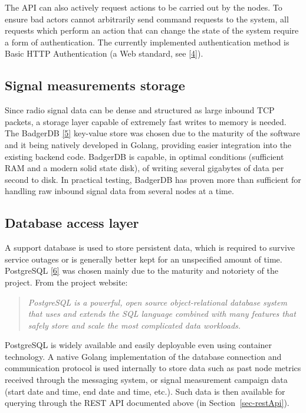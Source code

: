 \documentclass[
  letterpaper,
  a4paper,
  12pt,
  titlepage,
  oneside,
  openany]{book}
\begin{document}
The API can also actively request actions to be carried out by the
nodes. To ensure bad actors cannot arbitrarily send command requests to
the system, all requests which perform an action that can change the
state of the system require a form of authentication. The currently
implemented authentication method is Basic HTTP Authentication (a Web
standard, see \protect\hyperlink{ref-RFC7235}{{[}4{]}}).

\hypertarget{sec-signalStorage}{%
\subsection{Signal measurements storage}\label{sec-signalStorage}}

Since radio signal data can be dense and structured as large inbound TCP
packets, a storage layer capable of extremely fast writes to memory is
needed. The BadgerDB \protect\hyperlink{ref-BadgerDB}{{[}5{]}} key-value
store was chosen due to the maturity of the software and it being
natively developed in Golang, providing easier integration into the
existing backend code. BadgerDB is capable, in optimal conditions
(sufficient RAM and a modern solid state disk), of writing several
gigabytes of data per second to disk. In practical testing, BadgerDB has
proven more than sufficient for handling raw inbound signal data from
several nodes at a time.

\hypertarget{database-access-layer}{%
\subsection{Database access layer}\label{database-access-layer}}

A support database is used to store persistent data, which is required
to survive service outages or is generally better kept for an
unspecified amount of time. PostgreSQL
\protect\hyperlink{ref-groupPostgreSQL2023}{{[}6{]}} was chosen mainly
due to the maturity and notoriety of the project. From the project
website:

\begin{quote}
\emph{PostgreSQL is a powerful, open source object-relational database
system that uses and extends the SQL language combined with many
features that safely store and scale the most complicated data
workloads.}
\end{quote}

PostgreSQL is widely available and easily deployable even using
container technology. A native Golang implementation of the database
connection and communication protocol is used internally to store data
such as past node metrics received through the messaging system, or
signal measurement campaign data (start date and time, end date and
time, etc.). Such data is then available for querying through the REST
API documented above (in Section~\ref{sec-restApi}).
\end{document}
